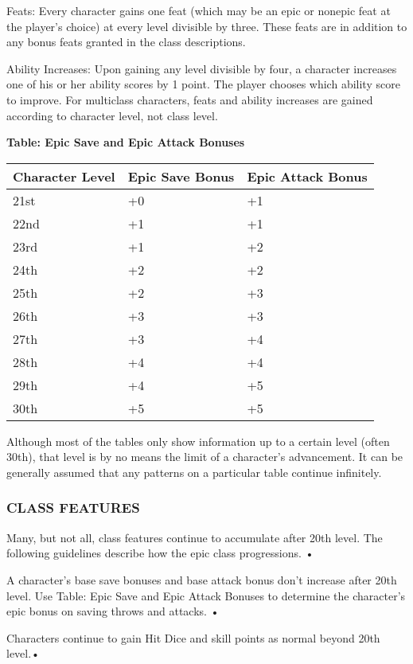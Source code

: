 \documentclass{article}
\begin{document}
Feats: Every character gains one feat (which may be an epic or nonepic feat at 
the player's choice) at every level divisible by three. These feats are in addition 
to any bonus feats granted in the class descriptions. 

Ability Increases: Upon gaining any level divisible by four, a character increases 
one of his or her ability scores by 1 point. The player chooses which ability score 
to improve. For multiclass characters, feats and ability increases are gained according 
to character level, not class level. 

\vspace{12pt}
\textbf{Table: Epic Save and Epic Attack Bonuses }

\begin{tabular}{|>{\raggedright}p{47pt}|>{\raggedright}p{51pt}|>{\raggedright}p{60pt}|}
\hline
C\textbf{haracter Level} & E\textbf{pic Save Bonus} & E\textbf{pic Attack Bonus}\tabularnewline
\hline
21st & +0 & +1\tabularnewline
\hline
22nd & +1 & +1\tabularnewline
\hline
23rd & +1 & +2\tabularnewline
\hline
24th & +2 & +2\tabularnewline
\hline
25th & +2 & +3\tabularnewline
\hline
26th & +3 & +3\tabularnewline
\hline
27th & +3 & +4\tabularnewline
\hline
28th & +4 & +4\tabularnewline
\hline
29th & +4 & +5\tabularnewline
\hline
30th & +5 & +5\tabularnewline
\hline
\end{tabular}

\vspace{12pt}
Although most of the tables only show information up to a certain level (often 
30th), that level is by no means the limit of a character's advancement. It can 
be generally assumed that any patterns on a particular table continue infinitely.

\vspace{12pt}
\subsubsection*{CLASS FEATURES }

Many, but not all, class features continue to accumulate after 20th level. The 
following guidelines describe how the epic class progressions. • 

\vspace{12pt}
A character's base save bonuses and base attack bonus don't increase after 20th 
level. Use Table: Epic Save and Epic Attack Bonuses to determine the character's 
epic bonus on saving throws and attacks. • 

Characters continue to gain Hit Dice and skill points as normal beyond 20th level.• 
\end{document}
